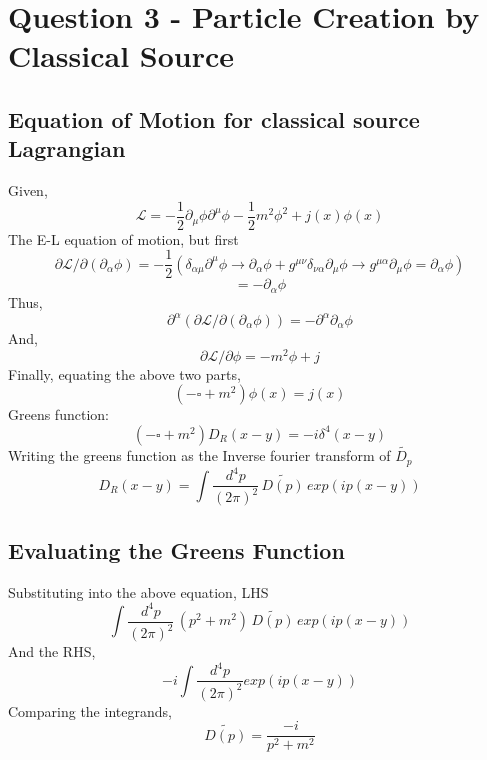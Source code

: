 \documentclass[11pt]{article}
\begin{document}
	\section*{\color{teal}Question 3 - Particle Creation by Classical Source}

	\subsection{Equation of Motion for classical source Lagrangian}
	
	Given,
	\[
		\mathcal{L} = -\frac{1}{2}\partial_\mu \phi \partial^\mu \phi - \frac{1}{2} m^2 \phi^2 + j(x)\phi(x)
	\]
	The E-L equation of motion, but first
	\[
		\partial \mathcal{L}/\partial (\partial_\alpha \phi) = - \frac{1}{2} (\delta_{\alpha \mu}\partial^\mu \phi \rightarrow \partial_\alpha \phi + g^{\mu \nu}\delta_{\nu\alpha} \partial_\mu \phi \rightarrow g^{\mu \alpha } \partial_\mu \phi = \partial_\alpha \phi)
	\]
	\[
		= -\partial_\alpha \phi
	\]
	Thus,
	\[
		\partial^\alpha( \partial \mathcal{L}/\partial (\partial_\alpha \phi)) =  -\partial^\alpha \partial_\alpha \phi
	\]
	And,
	\[
		\partial \mathcal{L}/\partial \phi = -m^2 \phi  + j 
	\]
	Finally, equating the above two parts,
	\[
		(-\square + m^2)\phi(x) = j(x)
	\]
	Greens function:
	\[
		(-\square + m^2)D_R(x-y) = -i\delta^4(x-y)
	\]
	Writing the greens function as the Inverse fourier transform of $\tilde{D_p}$
	\[
		D_R(x-y) = \int \frac{d^4p}{(2\pi)^2} \, \tilde{D(p)} \, exp(ip(x-y))
	\]
	
	\subsection{Evaluating the Greens Function}
	
	Substituting into the above equation, LHS
	\[
		\int \frac{d^4p}{(2\pi)^2} \, (p^2 + m^2) \, \tilde{D(p)} \, exp(ip(x-y))
	\]
	And the RHS,
	\[
		-i\int \frac{d^4p}{(2\pi)^2} exp(ip(x-y))
	\]
	Comparing the integrands,
	\[
		\tilde{D(p)} = \frac{-i}{p^2 + m^2}
	\]
	
\end{document}
